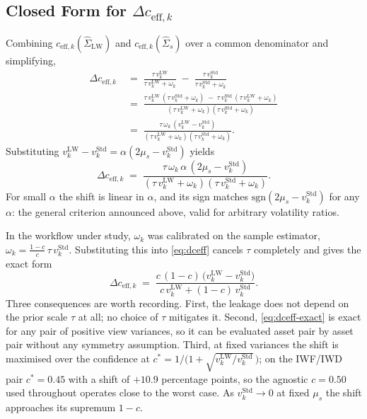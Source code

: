\documentclass[a4paper,11pt]{article}
\theoremstyle{plain}
\theoremstyle{definition}
\newcommand{\Std}{\mathrm{Std}}
\newcommand{\LW}{\mathrm{LW}}
\newcommand{\eff}{\mathrm{eff}}
\begin{document}
\subsection{Closed Form for $\Delta c_{\eff,k}$}
\label{sec:dceff}

Combining $c_{\eff,k}(\hat\Sigma_{\LW})$ and $c_{\eff,k}(\hat\Sigma_s)$
over a common denominator and simplifying,
\begin{align*}
  \Delta c_{\eff,k}
  \;&=\; \frac{\tau\,v_k^\LW}{\tau\,v_k^\LW + \omega_k}
        \;-\; \frac{\tau\,v_k^\Std}{\tau\,v_k^\Std + \omega_k}\\
  \;&=\; \frac{\tau\,v_k^\LW\,(\tau\,v_k^\Std + \omega_k) \;-\; \tau\,v_k^\Std\,(\tau\,v_k^\LW + \omega_k)}
              {(\tau\,v_k^\LW + \omega_k)(\tau\,v_k^\Std + \omega_k)}\\
  \;&=\; \frac{\tau\,\omega_k\,(v_k^\LW - v_k^\Std)}
              {(\tau\,v_k^\LW + \omega_k)(\tau\,v_k^\Std + \omega_k)}.
\end{align*}
Substituting $v_k^\LW - v_k^\Std = \alpha(2\mu_s - v_k^\Std)$ yields
\begin{equation}
\label{eq:dceff}
  \Delta c_{\eff,k}
  \;=\;
  \frac{\tau\,\omega_k\,\alpha\,(2\mu_s - v_k^\Std)}
       {(\tau\,v_k^\LW + \omega_k)(\tau\,v_k^\Std + \omega_k)}.
\end{equation}
For small $\alpha$ the shift is linear in $\alpha$, and its sign matches
$\mathrm{sgn}(2\mu_s - v_k^\Std)$ for any $\alpha$: the general criterion
announced above, valid for arbitrary volatility ratios.

In the workflow under study, $\omega_k$ was calibrated on the sample
estimator, $\omega_k = \tfrac{1-c}{c}\,\tau\,v_k^\Std$. Substituting
this into \eqref{eq:dceff} cancels $\tau$ completely and gives the exact
form
\begin{equation}
\label{eq:dceff-exact}
  \Delta c_{\eff,k}
  \;=\;
  \frac{c\,(1-c)\,\bigl(v_k^\LW - v_k^\Std\bigr)}
       {c\,v_k^\LW + (1-c)\,v_k^\Std}.
\end{equation}
Three consequences are worth recording. First, the leakage does not
depend on the prior scale $\tau$ at all; no choice of $\tau$ mitigates
it. Second, \eqref{eq:dceff-exact} is exact for any pair of positive
view variances, so it can be evaluated asset pair by asset pair without
any symmetry assumption. Third, at fixed variances the shift is
maximised over the confidence at
$c^* = 1/\bigl(1+\sqrt{v_k^{\LW}/v_k^\Std}\,\bigr)$; on the IWF/IWD
pair $c^* = 0.45$ with a shift of $+10.9$ percentage points, so the
agnostic $c = 0.50$ used throughout operates close to the worst case.
As $v_k^\Std \to 0$ at fixed $\mu_s$ the shift approaches its supremum
$1-c$.
\end{document}
